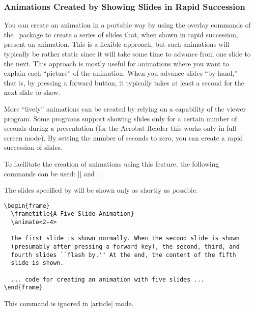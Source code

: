 \subsubsection{Animations Created by Showing Slides in Rapid Succession}

You can create an animation in a portable way by using the
overlay commands of the \beamer\ package to create a series of slides
that, when shown in rapid succession, present an animation. This is a
flexible approach, but such animations will typically be rather static
since it will take some time to advance from one slide to the
next. This approach is mostly useful for animations where you want
to explain each ``picture'' of the animation.
When you advance slides ``by hand,'' that is, by pressing a forward
button, it typically takes at least a second for the next slide to
show.

More ``lively'' animations can be created by relying on a capability
of the viewer program. Some programs support
showing slides only for a certain number of seconds during a
presentation (for the Acrobat Reader this works only in full-screen
mode). By setting the number of seconds to zero, you can create a
rapid succession of slides.

To facilitate the creation of animations using this feature, the
following commands can be used: |\animate| and |\animatevalue|.

\begin{command}{\animate{}}
  The slides specified by  will be shown
  only as shortly as  possible.
\example
\begin{verbatim}
\begin{frame}
  \frametitle{A Five Slide Animation}
  \animate<2-4>

  The first slide is shown normally. When the second slide is shown
  (presumably after pressing a forward key), the second, third, and
  fourth slides ``flash by.'' At the end, the content of the fifth
  slide is shown.

  ... code for creating an animation with five slides ...
\end{frame}
\end{verbatim}

  \articlenote
  This command is ignored in |article| mode.
\end{command}

